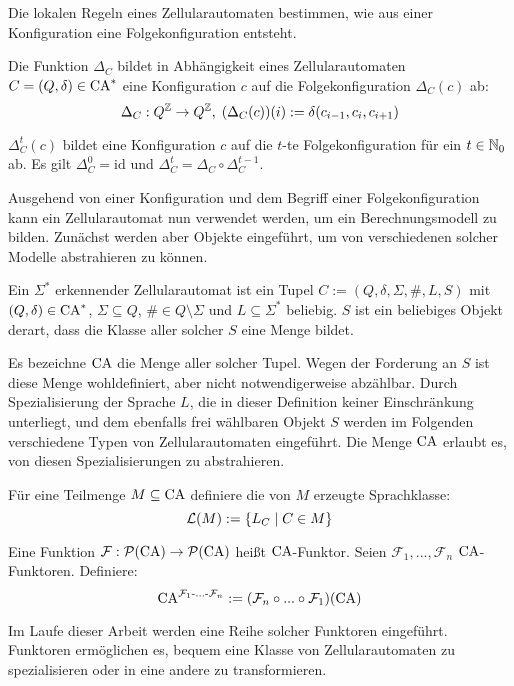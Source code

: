 Die lokalen Regeln eines Zellularautomaten bestimmen, wie aus einer Konfiguration eine Folgekonfiguration entsteht.

\begin{definition}[Folgekonfiguration]
    Die Funktion $\Delta_C$ bildet in Abhängigkeit eines
    Zellularautomaten $C = (Q, \delta) \in \textrm{CA}^*$ eine Konfiguration $c$ auf die Folgekonfiguration $\Delta_C(c)$ ab:
    \[ 
        \Delta_C: Q^{\mathbb{Z}} \to Q^{\mathbb{Z}}, \;
        (\Delta_C(c))(i) := \delta(c_{i - 1}, c_i, c_{i + 1})
    \]
    
    $\Delta_C^t(c)$ bildet eine Konfiguration $c$ auf die $t$-te Folgekonfiguration für ein $t \in \mathbb{N}_0$ ab.
    Es gilt $\Delta_C^0 = \mathrm{id}$ und $\Delta_C^t = \Delta_C \circ \Delta_C^{t-1}$.
\end{definition}

Ausgehend von einer Konfiguration und dem Begriff einer Folgekonfiguration kann ein Zellularautomat nun verwendet werden,
um ein Berechnungsmodell zu bilden. Zunächst werden aber Objekte eingeführt, um von verschiedenen solcher Modelle abstrahieren zu können.

\begin{definition}
    Ein $\Sigma^*$ erkennender Zellularautomat ist ein Tupel $C := (Q, \delta, \Sigma, \#, L, S)$ 
    mit $(Q, \delta) \in \textrm{CA}^*$, $\Sigma \subseteq Q$, $\# \in Q \setminus \Sigma$ und $L \subseteq \Sigma^*$ beliebig.
    $S$ ist ein beliebiges Objekt derart, dass die Klasse aller solcher $S$ eine Menge bildet.
    
    Es bezeichne $\textrm{CA}$ die Menge aller solcher Tupel. Wegen der Forderung an $S$ ist diese Menge wohldefiniert, aber nicht notwendigerweise abzählbar.
    Durch Spezialisierung der Sprache $L$, die in dieser Definition keiner Einschränkung unterliegt,
    und dem ebenfalls frei wählbaren Objekt $S$ werden im Folgenden verschiedene Typen von Zellularautomaten eingeführt.
    Die Menge $\textrm{CA}$ erlaubt es, von diesen Spezialisierungen zu abstrahieren.
    
    Für eine Teilmenge $M \subseteq \textrm{CA}$ definiere die von $M$ erzeugte Sprachklasse:
    \[
        \mathcal{L}(M) := \{ { L_C } \; | \; { C \in M } \}
    \]
\end{definition}

\begin{definition}
    Eine Funktion $\mathcal{F}: \mathcal{P}(\textrm{CA}) \to \mathcal{P}(\textrm{CA})$ heißt $\textrm{CA}$-Funktor.
    Seien $\mathcal{F}_1, ..., \mathcal{F}_n$ $\textrm{CA}$-Funktoren. Definiere:
    \[
        \textrm{CA}^{ \mathcal{F}_1 \text{-...-} \mathcal{F}_n } := (\mathcal{F}_n \circ ... \circ \mathcal{F}_1)(\textrm{CA})
    \]
    
    Im Laufe dieser Arbeit werden eine Reihe solcher Funktoren eingeführt.
    Funktoren ermöglichen es, bequem eine Klasse von Zellularautomaten zu spezialisieren oder in eine andere zu transformieren.
\end{definition}

